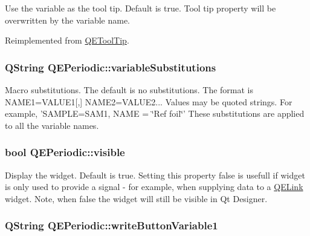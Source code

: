 \label{classQEPeriodic_a9145a9978f353143f53559816a2232f8}
Use the variable as the tool tip. Default is true. Tool tip property will be overwritten by the variable name. 

Reimplemented from \hyperlink{classQEToolTip}{QEToolTip}.

\hypertarget{classQEPeriodic_ad7cb653148f609d8932636b4430d75bb}{
\subsubsection[{variableSubstitutions}]{\setlength{\rightskip}{0pt plus 5cm}QString QEPeriodic::variableSubstitutions}}
\label{classQEPeriodic_ad7cb653148f609d8932636b4430d75bb}
Macro substitutions. The default is no substitutions. The format is NAME1=VALUE1\mbox{[},\mbox{]} NAME2=VALUE2... Values may be quoted strings. For example, 'SAMPLE=SAM1, NAME = \char`\"{}Ref foil\char`\"{}' These substitutions are applied to all the variable names. \hypertarget{classQEPeriodic_a928f00366d141ce588ab39372c785c9f}{
\subsubsection[{visible}]{\setlength{\rightskip}{0pt plus 5cm}bool QEPeriodic::visible}}
\label{classQEPeriodic_a928f00366d141ce588ab39372c785c9f}
Display the widget. Default is true. Setting this property false is usefull if widget is only used to provide a signal -\/ for example, when supplying data to a \hyperlink{classQELink}{QELink} widget. Note, when false the widget will still be visible in Qt Designer. \hypertarget{classQEPeriodic_a39ccfb959ab6a662a0b2e70be6be1ba7}{
\subsubsection[{writeButtonVariable1}]{\setlength{\rightskip}{0pt plus 5cm}QString QEPeriodic::writeButtonVariable1}}
